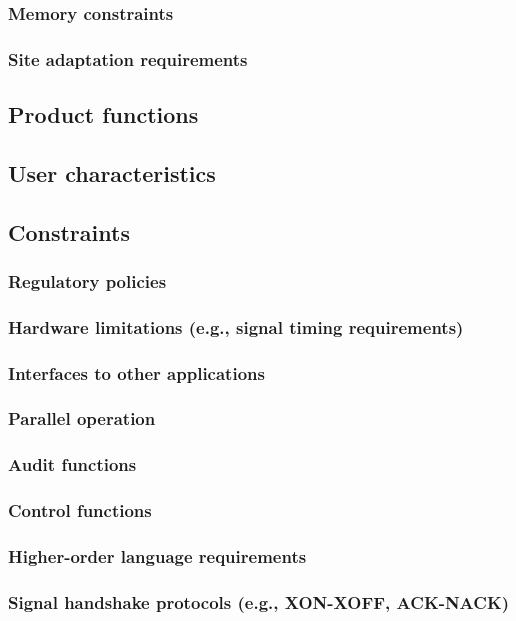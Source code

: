 \documentclass[draftclsnofoot,onecolumn,letterpaper,10pt,compsoc]{IEEEtran}
\begin{document}
		\subsubsection{Memory constraints}
		\subsubsection{Site adaptation requirements}
	\subsection{Product functions}
	\subsection{User characteristics}
	\subsection{Constraints}
		\subsubsection{Regulatory policies}
		\subsubsection{Hardware limitations (e.g., signal timing requirements)}
		\subsubsection{Interfaces to other applications}
		\subsubsection{Parallel operation}
		\subsubsection{Audit functions}
		\subsubsection{Control functions}
		\subsubsection{Higher-order language requirements}
		\subsubsection{Signal handshake protocols (e.g., XON-XOFF, ACK-NACK)}
\end{document}
